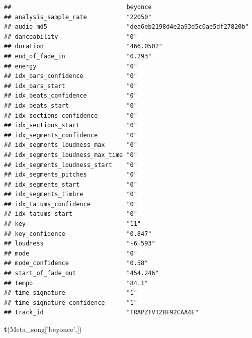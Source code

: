 \documentclass[]{article}
\newenvironment{Shaded}{\begin{snugshade}}{\end{snugshade}}
\newcommand{\KeywordTok}[1]{\textcolor[rgb]{0.13,0.29,0.53}{\textbf{#1}}}
\newcommand{\StringTok}[1]{\textcolor[rgb]{0.31,0.60,0.02}{#1}}
\newcommand{\NormalTok}[1]{#1}
\begin{document}
\begin{verbatim}
##                                beyonce                           
## analysis_sample_rate           "22050"                           
## audio_md5                      "dea6eb2198d4e2a93d5c0ae5df27820b"
## danceability                   "0"                               
## duration                       "466.0502"                        
## end_of_fade_in                 "0.293"                           
## energy                         "0"                               
## idx_bars_confidence            "0"                               
## idx_bars_start                 "0"                               
## idx_beats_confidence           "0"                               
## idx_beats_start                "0"                               
## idx_sections_confidence        "0"                               
## idx_sections_start             "0"                               
## idx_segments_confidence        "0"                               
## idx_segments_loudness_max      "0"                               
## idx_segments_loudness_max_time "0"                               
## idx_segments_loudness_start    "0"                               
## idx_segments_pitches           "0"                               
## idx_segments_start             "0"                               
## idx_segments_timbre            "0"                               
## idx_tatums_confidence          "0"                               
## idx_tatums_start               "0"                               
## key                            "11"                              
## key_confidence                 "0.847"                           
## loudness                       "-6.593"                          
## mode                           "0"                               
## mode_confidence                "0.58"                            
## start_of_fade_out              "454.246"                         
## tempo                          "84.1"                            
## time_signature                 "1"                               
## time_signature_confidence      "1"                               
## track_id                       "TRAPZTV128F92CAA4E"
\end{verbatim}

\begin{Shaded}
\begin{Highlighting}[]
\KeywordTok{t}\NormalTok{(Meta_song[}\StringTok{'beyonce'}\NormalTok{,])}
\end{Highlighting}
\end{Shaded}
\end{document}
